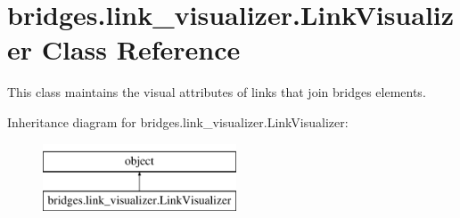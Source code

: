\hypertarget{classbridges_1_1link__visualizer_1_1_link_visualizer}{}\section{bridges.\+link\+\_\+visualizer.\+Link\+Visualizer Class Reference}
\label{classbridges_1_1link__visualizer_1_1_link_visualizer}


This class maintains the visual attributes of links that join bridges elements.  


Inheritance diagram for bridges.\+link\+\_\+visualizer.\+Link\+Visualizer\+:\begin{figure}[H]
\begin{center}
\leavevmode
\includegraphics[height=2.000000cm]{classbridges_1_1link__visualizer_1_1_link_visualizer}
\end{center}
\end{figure}
